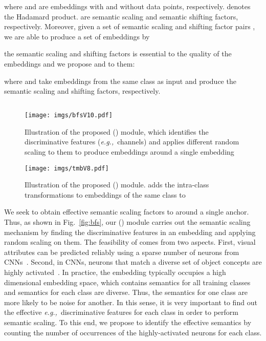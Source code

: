 \documentclass[runningheads]{llncs}
\def\eg{\emph{e.g.,}} \def\Eg{\emph{E.g.}}
\begin{document}
where  and  are embeddings with and without data points, respectively.  denotes the Hadamard product.  are semantic scaling and semantic shifting factors, respectively. Moreover, given a set of semantic scaling and shifting factor pairs , we are able to produce a set of embeddings by


 the semantic scaling and shifting factors is essential to the quality of the  embeddings and we propose \shortbfs and \shorttmb to  them:

where \shortbfs and \shorttmb take embeddings from the same class as input and produce the semantic scaling and shifting factors, respectively.

\subsection{\bfs}
\label{sec:bfs}

\begin{figure*}[!h]
    \centering
    \begin{minipage}[t]{.48\linewidth}
        \centering
        \texttt{[image: imgs/bfsV10.pdf]}
        \caption{Illustration of the proposed \bfs (\shortbfs) module, which identifies the discriminative features (\eg~channels) and applies different random scaling to them to produce embeddings around a single embedding\fullstop 
}
        \label{fig:bfs}
    \end{minipage}
    \hskip 0.08in
    \begin{minipage}[t]{.48\linewidth}
        \centering
        \texttt{[image: imgs/tmbV8.pdf]}
        \caption{Illustration of the proposed \tmb (\shorttmb) module. \shorttmb adds the intra-class transformations to embeddings of the same class to }
        \label{fig:tmb}
    \end{minipage}
\end{figure*}



We seek to obtain effective semantic scaling factors to  around a single anchor. Thus, as shown in Fig.~\ref{fig:bfs}, our \bfs (\shortbfs) module carries out the semantic scaling mechanism by finding the discriminative features in an embedding and applying random scaling on them. The feasibility of \shortbfs comes from two aspects. First, visual attributes can be predicted reliably using a sparse number of neurons from CNNs~\cite{escorcia2015relationship}. Second, in CNNs, neurons that match a diverse set of object concepts are highly activated~\cite{bau2017network,bau2020understanding}. In practice, the embedding typically occupies a high dimensional embedding space, which contains semantics for all training classes and semantics for each class are diverse. Thus, the semantics for one class are more likely to be noise for another. In this sense, it is very important to find out the effective \eg~discriminative features for each class in order to perform semantic scaling. To this end, we propose to identify the effective semantics by counting the number of occurrences of the highly-activated neurons for each class.
\end{document}
